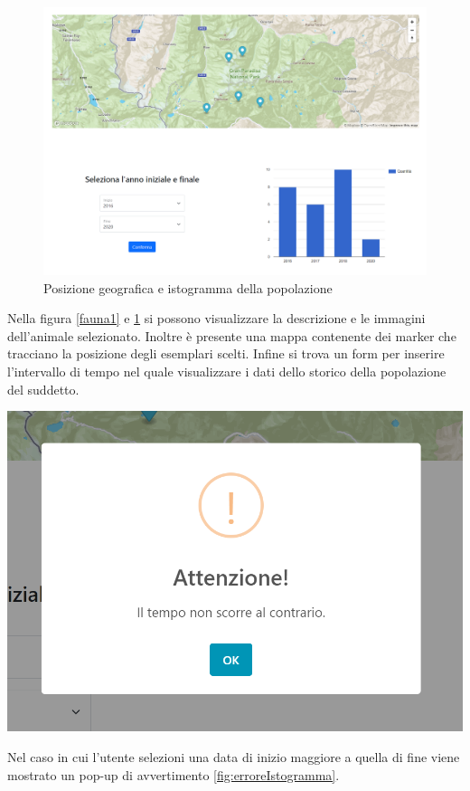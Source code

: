 \begin{figure}[ht]   
\centering
\includegraphics[scale=0.45]{Img/Fauna2.png}
    \caption{Posizione geografica e istogramma della popolazione}
    \label{fauna2}
\end{figure}

Nella figura \ref{fauna1} e \ref{fauna2} si possono visualizzare la descrizione e le immagini dell'animale selezionato. Inoltre è presente una mappa contenente dei marker che tracciano la posizione degli esemplari scelti. Infine si trova un form per inserire l'intervallo di tempo nel quale visualizzare i dati dello storico della popolazione del suddetto.

\begin{multicols}{2}
    \begin{Figure}
        \centering
        \includegraphics[scale=0.35]{Img/erroreIstogramma.png}
        \label{fig:erroreIstogramma}
    \end{Figure}
    \columnbreak
    Nel caso in cui l'utente selezioni una data di inizio maggiore a quella di fine viene mostrato un pop-up di avvertimento \ref{fig:erroreIstogramma}.
\end{multicols}

